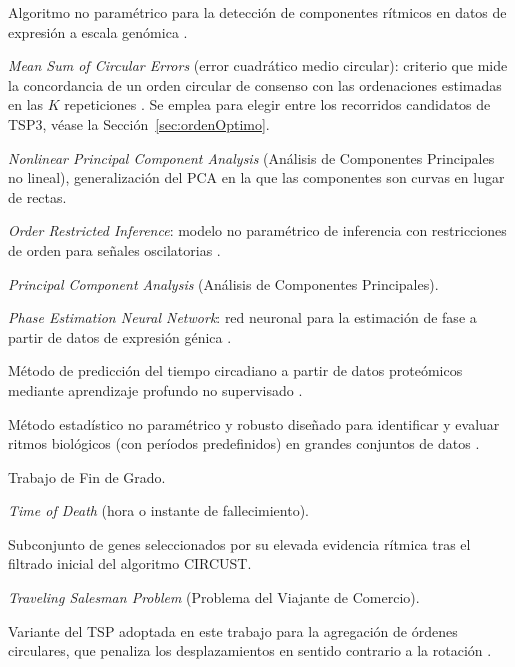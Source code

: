 \documentclass[12pt, a4paper]{report}
\begin{document}
\begin{description}[leftmargin=2.4cm, style=nextline]
\item[JTK\_CYCLE] Algoritmo no paramétrico para la detección de componentes rítmicos en datos de expresión a escala genómica \cite{jtkcycle2010}.
\item[MSCE] \emph{Mean Sum of Circular Errors} (error cuadrático medio circular): criterio que mide la concordancia de un orden circular de consenso con las ordenaciones estimadas en las \(K\) repeticiones \cite{barragan2015}. Se emplea para elegir entre los recorridos candidatos de TSP3, véase la Sección~\ref{sec:ordenOptimo}.
\item[NLPCA] \emph{Nonlinear Principal Component Analysis} (Análisis de Componentes Principales no lineal), generalización del PCA en la que las componentes son curvas en lugar de rectas.
\item[ORI] \emph{Order Restricted Inference}: modelo no paramétrico de inferencia con restricciones de orden para señales oscilatorias \cite{larriba2020}.
\item[PCA] \emph{Principal Component Analysis} (Análisis de Componentes Principales).
\item[PENN] \emph{Phase Estimation Neural Network}: red neuronal para la estimación de fase a partir de datos de expresión génica \cite{penn2023}.
\item[PROTECT] Método de predicción del tiempo circadiano a partir de datos proteómicos mediante aprendizaje profundo no supervisado \cite{protect}.
\item[RAIN] Método estadístico no paramétrico y robusto diseñado para identificar y evaluar ritmos biológicos (con períodos predefinidos) en grandes conjuntos de datos \cite{rain2014}.
\item[TFG] Trabajo de Fin de Grado.
\item[TOD] \emph{Time of Death} (hora o instante de fallecimiento).
\item[TOP] Subconjunto de genes seleccionados por su elevada evidencia rítmica tras el filtrado inicial del algoritmo CIRCUST.
\item[TSP] \emph{Traveling Salesman Problem} (Problema del Viajante de Comercio).
\item[TSP3] Variante del TSP adoptada en este trabajo para la agregación de órdenes circulares, que penaliza los desplazamientos en sentido contrario a la rotación \cite{barragan2015}.
\end{description}
\end{document}
